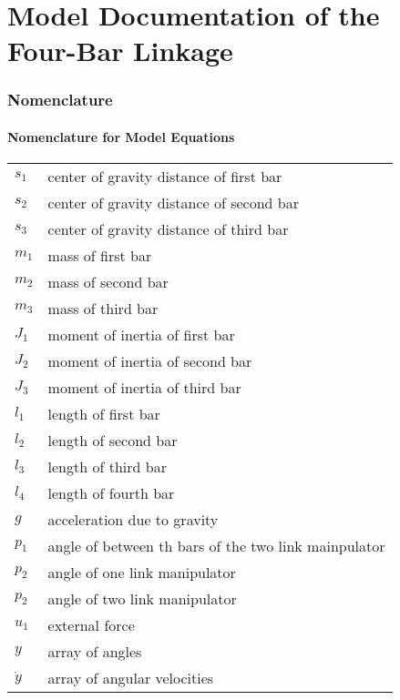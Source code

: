 \documentclass[10pt,a4paper]{article}
\begin{document}
	\part*{Model Documentation of the \\ Four-Bar Linkage} %
	
	
	\section{Nomenclature} %
	\subsection{Nomenclature for Model Equations} %
	
	\begin{tabular}{ll}
		$s_1$ & center of gravity distance of first bar \\
		$s_2$ & center of gravity distance of second bar \\
		$s_3$ & center of gravity distance of third bar \\
		$m_1$ & mass of first bar \\
		$m_2$ & mass of second bar \\
		$m_3$ & mass of third bar \\
		$J_1$ & moment of inertia of first bar\\
		$J_2$ & moment of inertia of second bar\\
		$J_3$ & moment of inertia of third bar\\
		$l_1$ & length of first bar\\
		$l_2$ & length of second bar\\
		$l_3$ & length of third bar\\
		$l_4$ & length of fourth bar\\
		$g$ & acceleration due to gravity\\
		$p_1$ & angle of between th bars of the two link mainpulator\\
		$p_2$ & angle of one link manipulator\\
		$p_2$ & angle of two link manipulator\\
		$u_1$ & external force\\
		$y$ & array of angles\\
		$\dot{y}$ & array of angular velocities\\
				
	\end{tabular}
	 
\end{document}
